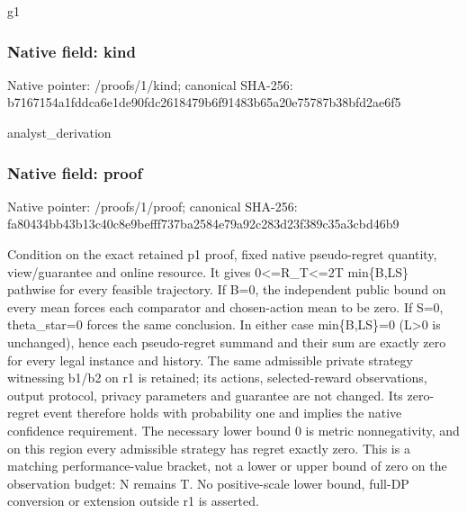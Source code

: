 \documentclass[10pt,a4paper]{article}
\begin{document}
\begingroup\raggedright\sloppy g1\par\endgroup

\subsubsection{Native field: kind}
Native pointer: /proofs/1/kind; canonical SHA-256: b7167154a1fddca6e1de90fdc2618479b6f91483b65a20e75787b38bfd2ae6f5

\begingroup\raggedright\sloppy analyst\_\allowbreak{}derivation\par\endgroup

\subsubsection{Native field: proof}
Native pointer: /proofs/1/proof; canonical SHA-256: fa80434bb43b13c40c8e9befff737ba2584e79a92c283d23f389c35a3cbd46b9

\begingroup\raggedright\sloppy Condition on the exact retained p1 proof,\allowbreak{} fixed native pseudo-regret quantity,\allowbreak{} view/\allowbreak{}guarantee and online resource. It gives 0<=\allowbreak{}R\_\allowbreak{}T<=\allowbreak{}2T min\{B,\allowbreak{}LS\} pathwise for every feasible trajectory. If B=\allowbreak{}0,\allowbreak{} the independent public bound on every mean forces each comparator and chosen-action mean to be zero. If S=\allowbreak{}0,\allowbreak{} theta\_\allowbreak{}star=\allowbreak{}0 forces the same conclusion. In either case min\{B,\allowbreak{}LS\}=\allowbreak{}0 (L>0 is unchanged),\allowbreak{} hence each pseudo-regret summand and their sum are exactly zero for every legal instance and history. The same admissible private strategy witnessing b1/\allowbreak{}b2 on r1 is retained;\allowbreak{} its actions,\allowbreak{} selected-reward observations,\allowbreak{} output protocol,\allowbreak{} privacy parameters and guarantee are not changed. Its zero-regret event therefore holds with probability one and implies the native confidence requirement. The necessary lower bound 0 is metric nonnegativity,\allowbreak{} and on this region every admissible strategy has regret exactly zero. This is a matching performance-value bracket,\allowbreak{} not a lower or upper bound of zero on the observation budget:\allowbreak{} N remains T. No positive-scale lower bound,\allowbreak{} full-DP conversion or extension outside r1 is asserted.\par\endgroup
\end{document}
